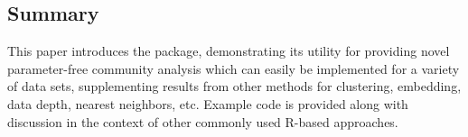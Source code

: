 \hypertarget{summary}{%
\subsection{Summary}\label{summary}}

This paper introduces the  package, demonstrating its utility for providing novel parameter-free community analysis which can easily be implemented for a variety of data sets, supplementing results from other methods for clustering, embedding, data depth, nearest neighbors, etc. Example code is provided along with discussion in the context of other commonly used R-based approaches.



\address{%
Lucy D'Agostino McGowan\\
Wake Forest University\\%
Winston-Salem, NC\\ 27106\\
%
%
%
\href{mailto:mcgowald@wfu.edu}{\nolinkurl{mcgowald@wfu.edu}}%
}

\address{%
Katherine Moore\\
Amherst College\\%
Amherst, MA\\ 1002\\
%
%
%
\href{mailto:kmoore@amherst.edu}{\nolinkurl{kmoore@amherst.edu}}%
}

\address{%
Kenneth S. Berenhaut\\
Wake Forest University\\%
Winston-Salem, NC\\ 27106\\
%
%
%
\href{mailto:berenhks@wfu.edu}{\nolinkurl{berenhks@wfu.edu}}%
}
